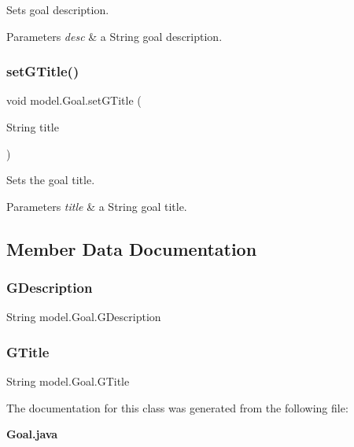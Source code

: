 Sets goal description. 
\begin{DoxyParams}{Parameters}
{\em desc} & a String goal description. \\
\hline
\end{DoxyParams}
\mbox{\label{classmodel_1_1_goal_ad6d65d6b80ef10f1c4393d66e1f3857e}} 
\subsubsection{set\+G\+Title()}
{\footnotesize\ttfamily void model.\+Goal.\+set\+G\+Title (\begin{DoxyParamCaption}\item[{String}]{title }\end{DoxyParamCaption})\hspace{0.3cm}{\ttfamily [private]}}

Sets the goal title. 
\begin{DoxyParams}{Parameters}
{\em title} & a String goal title. \\
\hline
\end{DoxyParams}


\subsection{Member Data Documentation}
\mbox{\label{classmodel_1_1_goal_ad06c51e41acda20069c830004ea39784}} 
\subsubsection{G\+Description}
{\footnotesize\ttfamily String model.\+Goal.\+G\+Description\hspace{0.3cm}{\ttfamily [private]}}

\mbox{\label{classmodel_1_1_goal_a5633a90e3aaf4573ed9368af4304f303}} 
\subsubsection{G\+Title}
{\footnotesize\ttfamily String model.\+Goal.\+G\+Title\hspace{0.3cm}{\ttfamily [private]}}



The documentation for this class was generated from the following file\+:\begin{DoxyCompactItemize}
\item 
\textbf{ Goal.\+java}\end{DoxyCompactItemize}
